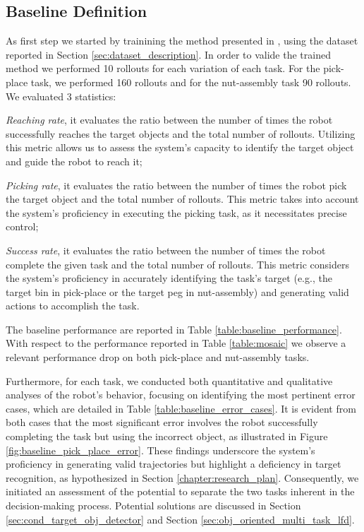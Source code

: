 \subsection{Baseline Definition}
\label{sec:baseline_definition}
As first step we started by trainining the method presented in \cite{mandi2022towards_more_generalizable_one_shot}, using the dataset reported in Section \ref{sec:dataset_description}. In order to valide the trained method we performed 10 rollouts for each variation of each task. For the pick-place task, we performed 160 rollouts and for the nut-assembly task 90 rollouts. We evaluated 3 statistics:
\begin{enumerate*}[label=(\arabic*)]
    \item \textit{Reaching rate}, it evaluates the ratio between the number of times the robot successfully reaches the target objects and the total number of rollouts. Utilizing this metric allows us to assess the system's capacity to identify the target object and guide the robot to reach it;
    \item \textit{Picking rate}, it evaluates the ratio between the number of times the robot pick the target object and the total number of rollouts. This metric takes into account the system's proficiency in executing the picking task, as it necessitates precise control;
    \item \textit{Success rate}, it evaluates the ratio between the number of times the robot complete the given task and the total number of rollouts. This metric considers the system's proficiency in accurately identifying the task's target (e.g., the target bin in pick-place or the target peg in nut-assembly) and generating valid actions to accomplish the task.
\end{enumerate*}
The baseline performance are reported in Table \ref{table:baseline_performance}. With respect to the performance reported in Table \ref{table:mosaic} we observe a relevant performance drop on both pick-place and nut-assembly tasks.

\newline Furthermore, for each task, we conducted both quantitative and qualitative analyses of the robot's behavior, focusing on identifying the most pertinent error cases, which are detailed in Table \ref{table:baseline_error_cases}. It is evident from both cases that the most significant error involves the robot successfully completing the task but using the incorrect object, as illustrated in Figure \ref{fig:baseline_pick_place_error}. These findings underscore the system's proficiency in generating valid trajectories but highlight a deficiency in target recognition, as hypothesized in Section \ref{chapter:research_plan}. Consequently, we initiated an assessment of the potential to separate the two tasks inherent in the decision-making process. Potential solutions are discussed in Section \ref{sec:cond_target_obj_detector} and Section \ref{sec:obj_oriented_multi_task_lfd}.


